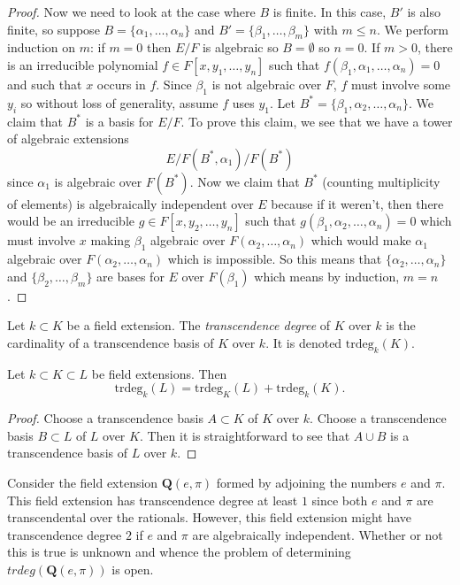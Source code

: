 \begin{proof}
\medskip\noindent
Now we need to look at the case where $B$ is finite.
In this case, $B'$ is also finite, so suppose
$B = \{\alpha_1, \ldots, \alpha_n\}$ and
$B' = \{\beta_1, \ldots, \beta_m\}$ with $m \leq n$.
We perform induction on $m$: if $m = 0$ then $E/F$ is algebraic so
$B = \emptyset$ so $n = 0$. If $m > 0$, there is an irreducible polynomial
$f \in F[x, y_1, \ldots, y_n]$ such that
$f(\beta_1, \alpha_1, \ldots, \alpha_n) = 0$ and such that $x$ occurs in $f$.
Since $\beta_1$ is not algebraic over $F$, $f$ must involve some $y_i$
so without loss of generality, assume $f$ uses $y_1$.
Let $B^* = \{\beta_1, \alpha_2, \ldots, \alpha_n\}$.
We claim that $B^*$ is a basis for $E/F$. To prove this claim, we see that
we have a tower of algebraic extensions
$$
E/ F(B^*, \alpha_1) / F(B^*)
$$
since $\alpha_1$ is algebraic over $F(B^*)$.
Now we claim that $B^*$ (counting multiplicity of elements) is
algebraically independent over $E$ because if it weren't, then there would be an
irreducible $g\in F[x, y_2, \ldots, y_n]$ such that
$g(\beta_1, \alpha_2, \ldots, \alpha_n) = 0$
which must involve $x$ making $\beta_1$
algebraic over $F(\alpha_2, \ldots, \alpha_n)$ which would make $\alpha_1$
algebraic over $F(\alpha_2, \ldots, \alpha_n)$ which is impossible.
So this means that $\{\alpha_2, \ldots, \alpha_n\}$ and
$\{\beta_2, \ldots, \beta_m\}$ are bases for $E$ over $F(\beta_1)$
which means by induction, $m = n$. 
\end{proof}

\begin{definition}
\label{definition-transcendence-degree}
Let $k \subset K$ be a field extension.
The {\it transcendence degree} of $K$ over $k$ is
the cardinality of a transcendence basis of $K$ over $k$.
It is denoted $\text{trdeg}_k(K)$.
\end{definition}

\begin{lemma}
\label{lemma-transcendence-degree-tower}
Let $k \subset K \subset L$ be field extensions.
Then
$$
\text{trdeg}_k(L) =
\text{trdeg}_K(L) +
\text{trdeg}_k(K).
$$
\end{lemma}

\begin{proof}
Choose a transcendence basis $A \subset K$ of $K$ over $k$.
Choose a transcendence basis $B \subset L$ of $L$ over $K$.
Then it is straightforward to see that $A \cup B$ is a transcendence
basis of $L$ over $k$.
\end{proof}

\begin{example}
\label{example-pi-e-transcendental}
Consider the field extension $\mathbf{Q}(e, \pi)$ formed by
adjoining the numbers $e$ and $\pi$. This field extension has transcendence
degree at least $1$ since both $e$ and $\pi$ are transcendental over the
rationals. However, this field extension might have transcendence
degree $2$ if $e$ and $\pi$ are algebraically independent. Whether or
not this is true is unknown and whence the problem of determining
$trdeg(\mathbf{Q}(e, \pi))$ is open.
\end{example}

